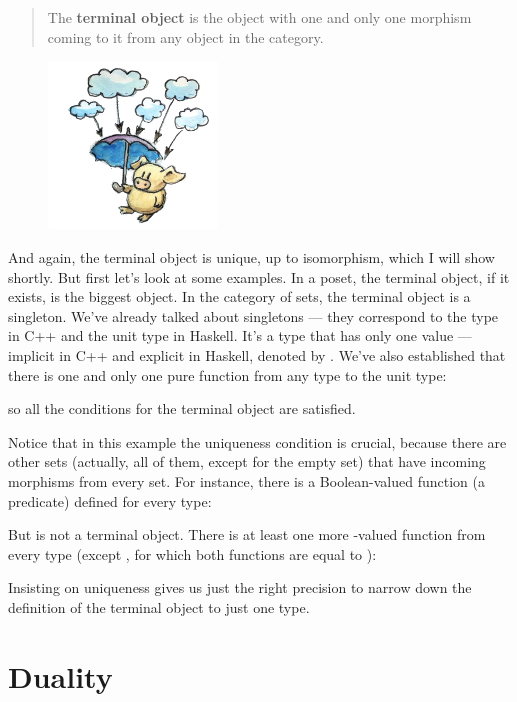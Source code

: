 \begin{quote}
  The \textbf{terminal object} is the object with one and only one
  morphism coming to it from any object in the category.
\end{quote}

\begin{figure}[H]
  \centering
  \includegraphics[width=0.4\textwidth]{images/final.jpg}
\end{figure}

\noindent
And again, the terminal object is unique, up to isomorphism, which I
will show shortly. But first let's look at some examples. In a poset,
the terminal object, if it exists, is the biggest object. In the
category of sets, the terminal object is a singleton. We've already
talked about singletons --- they correspond to the  type in
C++ and the unit type \code{()} in Haskell. It's a type that has only
one value --- implicit in C++ and explicit in Haskell, denoted by
\code{()}. We've also established that there is one and only one pure
function from any type to the unit type:

so all the conditions for the terminal object are satisfied.

Notice that in this example the uniqueness condition is crucial, because
there are other sets (actually, all of them, except for the empty set)
that have incoming morphisms from every set. For instance, there is a
Boolean-valued function (a predicate) defined for every type:

But  is not a terminal object. There is at least one more
-valued function from every type (except , for which both functions are equal to ):

Insisting on uniqueness gives us just the right precision to narrow down
the definition of the terminal object to just one type.

\section{Duality}

